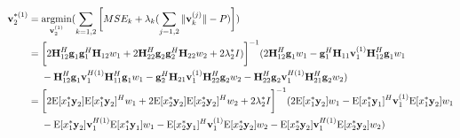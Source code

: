 \documentclass[11pt, oneside]{article}   	%
\begin{document}
\begin{align*}
\textbf{v}^{*(1)}_{2} 	&= \operatornamewithlimits{argmin}_{\textbf{v}^{(1)}_{2}}	(\displaystyle\sum_{k=1,2} 	\bigg[	MSE_{k}	+	\lambda_{k}	(\displaystyle\sum_{j=1,2}	\|	\textbf{v}^{(j)}_{k}	\|	-P	)	\bigg])	\\
				   &= 	\bigg[ 2	\textbf{H}^{H}_{12}	\textbf{g}_{1}	\textbf{g}^{H}_{1}		\textbf{H}_{12}	w_1
				   +	2	\textbf{H}^{H}_{22}	\textbf{g}_{2}	\textbf{g}^{H}_{2}		\textbf{H}_{22}	w_2	+2	\lambda^{*}_2 I)
				   \bigg]^{-1} 
				   (2	\textbf{H}^{H}_{12}	\textbf{g}_{1}	w_1		
				   -	\textbf{g}^{H}_{1}	\textbf{H}_{11}	\textbf{v}^{(1)}_{1} 	\textbf{H}^{H}_{12}	\textbf{g}_{1} w_1	\\
				   &\ \ \ \ 
				   -	\textbf{H}^{H}_{12}	\textbf{g}_{1}	\textbf{v}^{H(1)}_{1}	\textbf{H}^{H}_{11}	\textbf{g}_{1}	w_1
				   -	\textbf{g}^{H}_{2}	\textbf{H}_{21}	\textbf{v}^{(1)}_{1} 	\textbf{H}^{H}_{22}	\textbf{g}_{2}	w_2
				   -	\textbf{H}^{H}_{22}	\textbf{g}_{2}	\textbf{v}^{H(1)}_{1}	\textbf{H}^{H}_{21}	\textbf{g}_{2}	w_2
				   )\\
				   &=\bigg[	2	\mathrm{E}[x^*_1	\textbf{y}_2]	\mathrm{E}[x^*_1	\textbf{y}_2]^H	w_1
			      			+	2	\mathrm{E}[x^*_2	\textbf{y}_2]	\mathrm{E}[x^*_2	\textbf{y}_2]^H	w_2	+2	\lambda^{*}_2 I
			      	  \bigg]^{-1} 
				  (2	\mathrm{E}[x^*_1	\textbf{y}_2]	w_1
				  -\mathrm{E}[x^*_1	\textbf{y}_1]^H	\textbf{v}^{(1)}_{1} 	\mathrm{E}[x^*_1	\textbf{y}_2]	w_1	\\
				  &\ \ \ \ 	
				  -\mathrm{E}[x^*_1	\textbf{y}_2]	\textbf{v}^{H(1)}_{1} 	\mathrm{E}[x^*_1	\textbf{y}_1]	w_1	
				  -\mathrm{E}[x^*_2	\textbf{y}_1]^H	\textbf{v}^{(1)}_{1} 	\mathrm{E}[x^*_2	\textbf{y}_2]	w_2
				   -\mathrm{E}[x^*_2	\textbf{y}_2]	\textbf{v}^{H(1)}_{1} 	\mathrm{E}[x^*_2	\textbf{y}_2]	w_2	
				   )
\end{align*}
\end{document}
